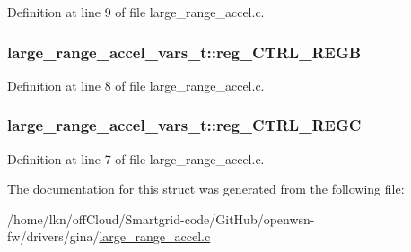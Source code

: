 Definition at line 9 of file large\+\_\+range\+\_\+accel.\+c.

\subsubsection[{\texorpdfstring{reg\+\_\+\+C\+T\+R\+L\+\_\+\+R\+E\+GB}{reg_CTRL_REGB}}]{ large\+\_\+range\+\_\+accel\+\_\+vars\+\_\+t\+::reg\+\_\+\+C\+T\+R\+L\+\_\+\+R\+E\+GB}\hypertarget{structlarge__range__accel__vars__t_a2f25a5e28f3832ea74322e3d0853ace6}{}\label{structlarge__range__accel__vars__t_a2f25a5e28f3832ea74322e3d0853ace6}


Definition at line 8 of file large\+\_\+range\+\_\+accel.\+c.

\subsubsection[{\texorpdfstring{reg\+\_\+\+C\+T\+R\+L\+\_\+\+R\+E\+GC}{reg_CTRL_REGC}}]{ large\+\_\+range\+\_\+accel\+\_\+vars\+\_\+t\+::reg\+\_\+\+C\+T\+R\+L\+\_\+\+R\+E\+GC}\hypertarget{structlarge__range__accel__vars__t_a8a5530548c1aa4aff744bf6bffc578f1}{}\label{structlarge__range__accel__vars__t_a8a5530548c1aa4aff744bf6bffc578f1}


Definition at line 7 of file large\+\_\+range\+\_\+accel.\+c.



The documentation for this struct was generated from the following file\+:\begin{DoxyCompactItemize}
\item 
/home/lkn/off\+Cloud/\+Smartgrid-\/code/\+Git\+Hub/openwsn-\/fw/drivers/gina/\hyperlink{large__range__accel_8c}{large\+\_\+range\+\_\+accel.\+c}\end{DoxyCompactItemize}
